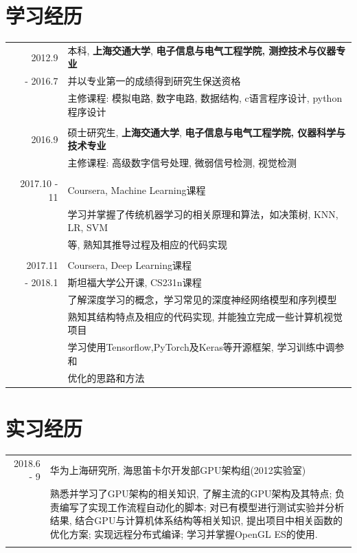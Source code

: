 \documentclass[a4paper,11pt]{article}
\begin{document}
\section{学习经历}
\begin{tabular}{rl}	
  \textsc{2012.9} & 本科, \textbf{上海交通大学}, \textbf{电子信息与电气工程学院, 测控技术与仪器专业}\\
  \textsc{- 2016.7} & 并以专业第一的成绩得到研究生保送资格\\
& 主修课程: 模拟电路, 数字电路, 数据结构, c语言程序设计, python程序设计\\&\\
 \textsc{2016.9  } & 硕士研究生, \textbf{上海交通大学}, \textbf{电子信息与电气工程学院, 仪器科学与技术专业}\\
& 主修课程: 高级数字信号处理, 微弱信号检测, 视觉检测\\&\\
 \textsc{2017.10 - 11} & Coursera, Machine Learning课程\\
& 学习并掌握了传统机器学习的相关原理和算法，如决策树, KNN, LR, SVM\\
& 等, 熟知其推导过程及相应的代码实现\\&\\
 \textsc{2017.11} & Coursera, Deep Learning课程\\
 \textsc{- 2018.1} & 斯坦福大学公开课, CS231n课程\\
& 了解深度学习的概念，学习常见的深度神经网络模型和序列模型\\
& 熟知其结构特点及相应的代码实现, 并能独立完成一些计算机视觉项目\\
& 学习使用Tensorflow,PyTorch及Keras等开源框架, 学习训练中调参和\\
& 优化的思路和方法\\
\end{tabular}

\section{实习经历}
\begin{tabular}{r|p{11cm}}
 \textsc{2018.6 - 9} & 华为上海研究所, 海思笛卡尔开发部GPU架构组(2012实验室) \\&\footnotesize{熟悉并学习了GPU架构的相关知识, 了解主流的GPU架构及其特点; 负责编写了实现工作流程自动化的脚本; 对已有模型进行测试实验并分析结果, 结合GPU与计算机体系结构等相关知识, 提出项目中相关函数的优化方案; 实现远程分布式编译; 学习并掌握OpenGL ES的使用.}\\\multicolumn{2}{c}{} \\
\end{tabular}
\end{document}

